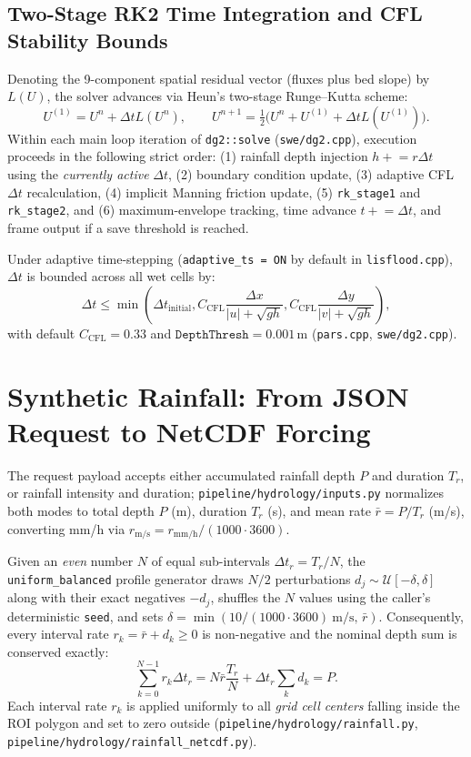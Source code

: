 \documentclass[11pt,a4paper]{article}
\newcommand{\src}[1]{\nolinkurl{#1}}
\newcommand{\unit}[1]{\mathrm{#1}}
\begin{document}
\subsection{Two-Stage RK2 Time Integration and CFL Stability Bounds}
Denoting the 9-component spatial residual vector (fluxes plus bed slope) by $L(U)$, the solver advances via Heun's two-stage Runge--Kutta scheme:
\begin{equation}
 U^{(1)}=U^n+\Delta t L(U^n),\qquad
 U^{n+1}=\tfrac12\bigl(U^n+U^{(1)}+\Delta t L(U^{(1)})\bigr).\label{eq:rk}
\end{equation}
Within each main loop iteration of \texttt{dg2::solve} (\src{swe/dg2.cpp}), execution proceeds in the following strict order: (1) rainfall depth injection $h \mathrel{+}= r\Delta t$ using the \emph{currently active} $\Delta t$, (2) boundary condition update, (3) adaptive CFL $\Delta t$ recalculation, (4) implicit Manning friction update, (5) \texttt{rk\_stage1} and \texttt{rk\_stage2}, and (6) maximum-envelope tracking, time advance $t \mathrel{+}= \Delta t$, and frame output if a save threshold is reached.

Under adaptive time-stepping (\texttt{adaptive\_ts = ON} by default in \src{lisflood.cpp}), $\Delta t$ is bounded across all wet cells by:
\begin{equation}
 \Delta t\leq\min\!\left(\Delta t_{\mathrm{initial}},
 C_{\mathrm{CFL}}\frac{\Delta x}{|u|+\sqrt{gh}},
 C_{\mathrm{CFL}}\frac{\Delta y}{|v|+\sqrt{gh}}\right),\label{eq:cfl}
\end{equation}
with default $C_{\mathrm{CFL}}=0.33$ and $\texttt{DepthThresh}=0.001$\,m (\src{pars.cpp}, \src{swe/dg2.cpp}).

\section{Synthetic Rainfall: From JSON Request to NetCDF Forcing}
\label{sec:lluvia}
The request payload accepts either accumulated rainfall depth $P$ and duration $T_r$, or rainfall intensity and duration; \src{pipeline/hydrology/inputs.py} normalizes both modes to total depth $P$ (m), duration $T_r$ (s), and mean rate $\bar{r}=P/T_r$ (m/s), converting mm/h via $r_{\mathrm{m/s}}=r_{\mathrm{mm/h}}/(1000\cdot3600)$.

Given an \emph{even} number $N$ of equal sub-intervals $\Delta t_r=T_r/N$, the \texttt{uniform\_balanced} profile generator draws $N/2$ perturbations $d_j\sim\mathcal U[-\delta,\delta]$ along with their exact negatives $-d_j$, shuffles the $N$ values using the caller's deterministic \texttt{seed}, and sets $\delta=\min(10/(1000\cdot 3600)\ \unit{m/s},\,\bar{r})$. Consequently, every interval rate $r_k=\bar{r}+d_k\geq0$ is non-negative and the nominal depth sum is conserved exactly:
\begin{equation}
 \sum_{k=0}^{N-1}r_k\Delta t_r
 =N\bar{r}\frac{T_r}{N}+\Delta t_r\sum_kd_k=P.\label{eq:rainbal}
\end{equation}
Each interval rate $r_k$ is applied uniformly to all \emph{grid cell centers} falling inside the ROI polygon and set to zero outside (\src{pipeline/hydrology/rainfall.py}, \src{pipeline/hydrology/rainfall_netcdf.py}).
\end{document}
